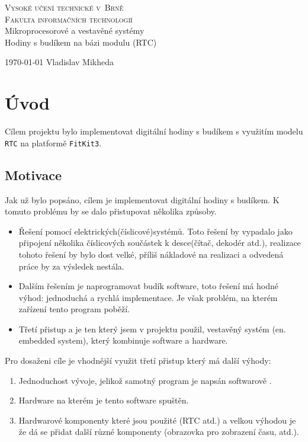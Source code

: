 \documentclass[a4paper,11pt]{article}
\begin{document}
\begin{titlepage}
    \begin{center}
        \Huge
        \textsc{Vysoké učení technické v~Brně\\
               \huge Fakulta informačních technologií}\\
               
        \LARGE
                Mikroprocesorové a vestavěné systémy\\
                \Huge  Hodiny s budíkem na bázi modulu (RTC)\\
    \end{center}
    
    {\Large \today \hfill
                Vladislav Mikheda\\
                }
\end{titlepage}

\newpage
\section{Úvod}
Cílem projektu bylo implementovat digitální hodiny s budíkem s využitím modelu \texttt{RTC} na platformě \texttt{FitKit3}.
\subsection{Motivace}
Jak už bylo popsáno, cílem je implementovat digitální hodiny s budíkem. K tomuto problému by se dalo přistupovat několika způsoby. 
\begin{itemize}
    \item Řešení pomocí elektrických(číslicové)systémů. Toto řešení by vypadalo jako připojení několika číslicových součástek k desce(čítač, dekodér atd.), realizace tohoto řešení by bylo dost velké, příliš nákladové na realizaci a odvedená práce by za výsledek nestála. 
    \item Dalším řešením je naprogramovat budík software, toto řešení má hodné výhod: jednoduchá a rychlá implementace. Je však problém, na kterém zařízení  tento program poběží.
    \item Třetí přistup a je ten který jsem v projektu použil, vestavěný systém (en. embedded system), který kombinuje software a hardware.
\end{itemize}
 Pro dosaženi cíle je vhodnější využit třetí přistup který má další výhody:
 \begin{enumerate}
     \item  Jednoduchost vývoje, jelikož samotný program je napsán softwarově .
     \item  Hardware na kterém je tento software spuštěn.
     \item  Hardwarové komponenty které jsou použité (RTC atd.) a velkou výhodou je že dá se přidat další různé komponenty (obrazovka pro zobrazení času, atd.).
 \end{enumerate}
\end{document}
